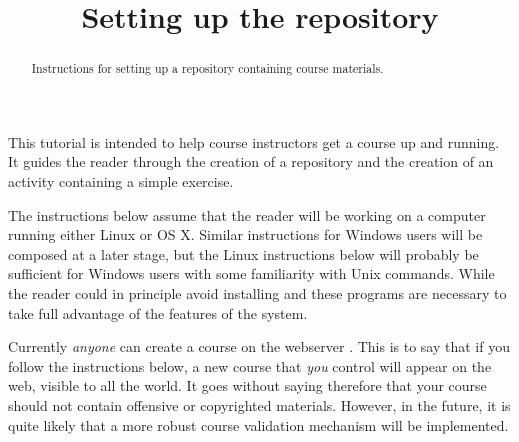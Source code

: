 \documentclass{ximera}
\title{Setting up the repository}
\begin{document}
\begin{abstract}
Instructions for setting up a repository containing course materials.
\end{abstract}
\maketitle

This tutorial is intended to help course instructors get a
 course up and running. It guides
the reader through the creation of a 
repository and the creation of an activity containing a simple
exercise.

The instructions below assume that the reader will be working on a
computer running either Linux or OS X.  Similar instructions for
Windows users will be composed at a later stage, but the Linux
instructions below will probably be sufficient for Windows users with
some familiarity with Unix commands.  While the reader could in
principle avoid installing  and
 these programs are necessary to take
full advantage of the features of the
 system.

\begin{warning} Currently {\em anyone} can
create a course on the webserver
.
This is to say that if you follow the instructions below,
a new course that {\em you} control will appear on the web,
visible to all the world. It goes without saying therefore that
your course should not contain offensive or copyrighted
materials. However, in the future, it is quite likely that a
more robust course validation mechanism will be implemented.
\end{warning}
\end{document}
